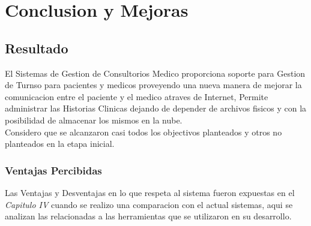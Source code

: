 \chapter{Conclusion y Mejoras}


\section{Resultado}

El Sistemas de Gestion de Consultorios Medico proporciona soporte para Gestion 
de Turnso para pacientes y medicos proveyendo una nueva manera de mejorar la 
comunicacion entre el paciente y el medico atraves de Internet, Permite 
administrar las Historias Clinicas dejando de depender de archivos fisicos y 
con la posibilidad de almacenar los mismos en la nube.\\[0.1cm]

Considero que se alcanzaron casi todos los objectivos planteados y otros no 
planteados en la etapa inicial.


\subsection{Ventajas Percibidas}

Las Ventajas y Desventajas en lo que respeta al sistema fueron expuestas en el 
\textit{Capitulo IV} cuando se realizo una comparacion con el actual sistemas,
aqui se analizan las relacionadas a las herramientas que se utilizaron en su 
desarrollo.

